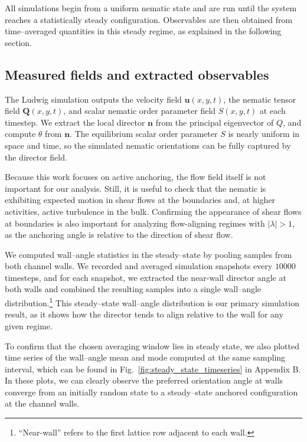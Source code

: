 \documentclass[11pt]{article}
\begin{document}
All simulations begin from a uniform nematic state and are run until the system reaches a statistically steady configuration. Observables are then obtained from time--averaged quantities in this steady regime, as explained in the following section.

\subsection{Measured fields and extracted observables}
\label{sec:measured_fields_and_observables}

The Ludwig simulation outputs the velocity field $\mathbf{u}(x,y,t)$, the nematic tensor field $\mathbf{Q}(x,y,t)$, and scalar nematic order parameter field $S(x,y,t)$ at each timestep. We extract the local director $\mathbf{n}$ from the principal eigenvector of $Q$, and compute $\theta$ from $\mathbf{n}$. The equilibrium scalar order parameter $S$ is nearly uniform in space and time, so the simulated nematic orientations can be fully captured by the director field. 

Because this work focuses on active anchoring, the flow field itself is not important for our analysis. Still, it is useful to check that the nematic is exhibiting expected motion in shear flows at the boundaries and, at higher activities, active turbulence in the bulk. Confirming the appearance of shear flows at boundaries is also important for analyzing flow-aligning regimes with $|\lambda|>1$, as the anchoring angle is relative to the direction of shear flow.

We computed wall--angle statistics in the steady--state by pooling samples from both channel walls. We recorded and averaged simulation snapshots every $10000$ timesteps, and for each snapshot, we extracted the near-wall director angle at both walls and combined the resulting samples into a single wall--angle distribution.\footnote{``Near-wall” refers to the first lattice row adjacent to each wall.} This steady--state wall--angle distribution is our primary simulation result, as it shows how the director tends to align relative to the wall for any given regime.  

To confirm that the chosen averaging window lies in steady state, we also plotted time series of the wall--angle mean and mode computed at the same sampling interval, which can be found in Fig.~\ref{fig:steady_state_timeseries} in Appendix B. In these plots, we can clearly observe the preferred orientation angle at walls converge from an initially random state to a steady--state anchored configuration at the channel walls. 
\end{document}
